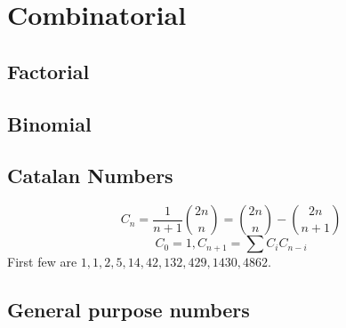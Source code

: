 
\chapter{Combinatorial}

	\section{Factorial}
		

	\section{Binomial}

	\section{Catalan Numbers}
		$$C_n=\frac{1}{n+1}{2n \choose n} = {2n \choose n}-{2n\choose n+1}$$
		$$C_0=1, C_{n+1}=\sum C_iC_{n-i}$$
		First few are $1, 1, 2, 5, 14, 42, 132, 429, 1430, 4862$.


	\section{General purpose numbers}
